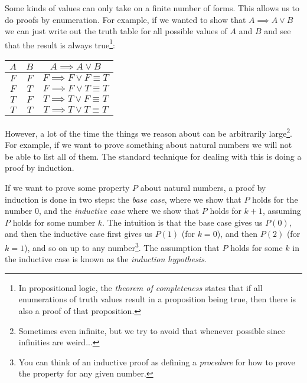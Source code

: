\documentclass{tufte-handout}
\newcounter{example}
\begin{document}
Some kinds of values can only take on a finite number of forms.
This allows us to do proofs by enumeration. For example, if we
wanted to show that $A \implies A \lor B$ we can just write out
the truth table for all possible values of $A$ and $B$ and see
that the result is always true\footnote{In propositional logic,
  the \emph{theorem of completeness} states that if all
  enumerations of truth values result in a proposition being true,
  then there is also a proof of that proposition.}:

\begin{tabular}{ccc}
  $A$&$B$&$A \implies A \lor B$\\
  \hline
  $F$ & $F$ & $F \implies F \lor F \equiv T$\\
  $F$ & $T$ & $F \implies F \lor T \equiv T$\\
  $T$ & $F$ & $T \implies T \lor F \equiv T$\\
  $T$ & $T$ & $T \implies T \lor T \equiv T$\\
\end{tabular}

However, a lot of the time the things we reason about can be
arbitrarily large\footnote{Sometimes even infinite, but we try to
  avoid that whenever possible since infinities are weird...}. For
example, if we want to prove something about natural numbers we
will not be able to list all of them. The standard technique for
dealing with this is doing a proof by induction.

If we want to prove some property $P$ about natural numbers, a
proof by induction is done in two steps: the \emph{base case},
where we show that $P$ holds for the number $0$, and the
\emph{inductive case} where we show that $P$ holds for $k + 1$,
assuming $P$ holds for some number $k$.
%
The intuition is that the base case gives us $P(0)$, and then the
inductive case first gives us $P(1)$ (for $k = 0$), and then
$P(2)$ (for $k = 1$), and so on up to any number\footnote{You can
  think of an inductive proof as defining a \emph{procedure} for
  how to prove the property for any given number.}.
%
The assumption that $P$ holds for some $k$ in the inductive case
is known as the \emph{induction hypothesis}.
\end{document}
